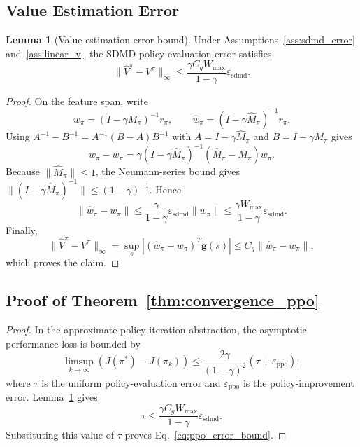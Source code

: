 \documentclass{article}
\numberwithin{equation}{section}
\theoremstyle{definition}
\newtheorem{lemma}[theorem]{Lemma}
\begin{document}
\subsection{Value Estimation Error}\label{lemmapf:value_error}
\begin{lemma}[Value estimation error bound]\label{lemma:value_error}
Under Assumptions~\ref{ass:sdmd_error} and~\ref{ass:linear_v}, the SDMD policy-evaluation error satisfies
\begin{equation*}
\|\widehat V^\pi-V^\pi\|_\infty
\le
\frac{\gamma C_g W_{\max}}{1-\gamma}\varepsilon_{\mathrm{sdmd}}.
\end{equation*}
\end{lemma}

\begin{proof}
On the feature span, write
\[
 w_\pi=(I-\gamma M_\pi)^{-1}r_\pi,
 \qquad
 \widehat w_\pi=(I-\gamma\widehat M_\pi)^{-1}r_\pi.
\]
Using $A^{-1}-B^{-1}=A^{-1}(B-A)B^{-1}$ with $A=I-\gamma\widehat M_\pi$ and $B=I-\gamma M_\pi$ gives
\[
\widehat w_\pi-w_\pi
=
\gamma(I-\gamma\widehat M_\pi)^{-1}(\widehat M_\pi-M_\pi)w_\pi.
\]
Because $\|\widehat M_\pi\|\le1$, the Neumann-series bound gives $\|(I-\gamma\widehat M_\pi)^{-1}\|\le(1-\gamma)^{-1}$. Hence
\[
\|\widehat w_\pi-w_\pi\|
\le
\frac{\gamma}{1-\gamma}\varepsilon_{\mathrm{sdmd}}\|w_\pi\|
\le
\frac{\gamma W_{\max}}{1-\gamma}\varepsilon_{\mathrm{sdmd}}.
\]
Finally,
\[
\|\widehat V^\pi-V^\pi\|_\infty
=\sup_s|(\widehat w_\pi-w_\pi)^T\mathbf g(s)|
\le
C_g\|\widehat w_\pi-w_\pi\|,
\]
which proves the claim.
\end{proof}

\subsection{Proof of Theorem~\ref{thm:convergence_ppo}}\label{thmpf:convergence_ppo}
\begin{proof}
In the approximate policy-iteration abstraction, the asymptotic performance loss is bounded by
\[
\limsup_{k\to\infty}(J(\pi^*)-J(\pi_k))
\le
\frac{2\gamma}{(1-\gamma)^2}(\tau+\varepsilon_{\mathrm{ppo}}),
\]
where $\tau$ is the uniform policy-evaluation error and $\varepsilon_{\mathrm{ppo}}$ is the policy-improvement error. Lemma~\ref{lemma:value_error} gives
\[
\tau\le\frac{\gamma C_g W_{\max}}{1-\gamma}\varepsilon_{\mathrm{sdmd}}.
\]
Substituting this value of $\tau$ proves Eq.~\eqref{eq:ppo_error_bound}.
\end{proof}
\end{document}
